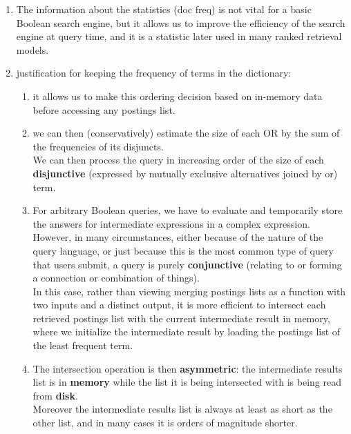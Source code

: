 \begin{enumerate}
    \item The information about the statistics (doc freq) is not vital for a basic Boolean search engine, but it allows us to improve the efficiency of the search engine at query time, and it is a statistic later used in many ranked retrieval models.

    \item justification for keeping the frequency of terms in the dictionary:
    \begin{enumerate}
        \item it allows us to make this ordering decision based on in-memory data before accessing any postings list.

        \item we can then (conservatively) estimate the size of each OR by the sum of the frequencies of its disjuncts.\\
        We can then process the query in increasing order of the size of each \textbf{disjunctive} (expressed by mutually exclusive alternatives joined by or) term.

        \item For arbitrary Boolean queries, we have to evaluate and temporarily store the answers for intermediate expressions in a complex expression. \\
        However, in many circumstances, either because of the nature of the query language, or just because this is the most common type of query that users submit, a query is purely \textbf{conjunctive} (relating to or forming a connection or combination of things).\\
        In this case, rather than viewing merging postings lists as a function with two inputs and a distinct output, it is more efficient to intersect each retrieved postings list with the current intermediate result in memory, where we initialize the intermediate result by loading the postings list of the least frequent term.

        \item The intersection operation is then \textbf{asymmetric}: the intermediate results list is in \textbf{memory} while the list it is being intersected with is being read from \textbf{disk}.\\
        Moreover the intermediate results list is always at least as short as the other list, and in many cases it is orders of magnitude shorter.
    \end{enumerate}
\end{enumerate}


